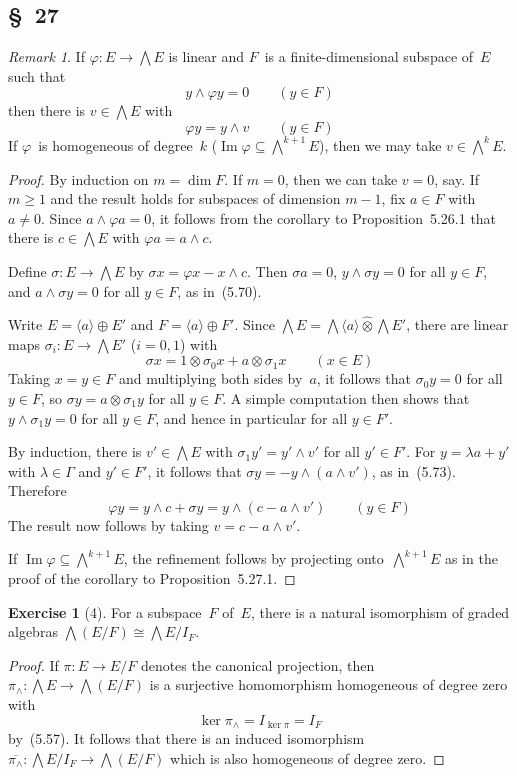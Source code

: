 \documentclass[letterpaper,12pt]{article}
\newcommand{\iso}{\cong}
\DeclareMathOperator{\im}{Im}
\newcommand{\dsum}{\oplus}
\newcommand{\tprod}{\otimes}
\newcommand{\stprod}{\mathbin{\widehat{\otimes}}}
\newcommand{\eprod}{\wedge}
\newcommand{\bigeprod}{\bigwedge}
\newcommand{\medeprod}{{\textstyle\bigeprod}}
\newcommand{\gen}[1]{\langle#1\rangle}
\newcommand{\proj}[1]{\overline{#1}}
\theoremstyle{definition}
\newtheorem*{exer}{Exercise}
\theoremstyle{remark}
\newtheorem*{rmk}{Remark}
\begin{document}
\subsection*{\S~27}
\begin{rmk}
If \(\varphi:E\to\medeprod E\) is linear and \(F\)~is a finite-dimensional subspace of~\(E\) such that
\[y\eprod\varphi y=0\qquad(y\in F)\]
then there is \(v\in\medeprod E\) with
\[\varphi y=y\eprod v\qquad(y\in F)\]
If \(\varphi\)~is homogeneous of degree~\(k\) (\(\im\varphi\subseteq\medeprod^{k+1}E\)), then we may take \(v\in\medeprod^k E\).
\end{rmk}
\begin{proof}
By induction on \(m=\dim F\). If \(m=0\), then we can take \(v=0\), say. If \(m\ge 1\) and the result holds for subspaces of dimension \(m-1\), fix \(a\in F\) with \(a\ne 0\). Since \(a\eprod\varphi a=0\), it follows from the corollary to Proposition~5.26.1 that there is \(c\in\medeprod E\) with \(\varphi a=a\eprod c\).

Define \(\sigma:E\to\medeprod E\) by \(\sigma x=\varphi x-x\eprod c\). Then \(\sigma a=0\), \(y\eprod\sigma y=0\) for all \(y\in F\), and \(a\eprod\sigma y=0\) for all \(y\in F\), as in~(5.70).

Write \(E=\gen{a}\dsum E'\) and \(F=\gen{a}\dsum F'\). Since \(\medeprod E=\medeprod\gen{a}\stprod\medeprod E'\), there are linear maps \(\sigma_i:E\to\medeprod E'\) (\(i=0,1\)) with
\[\sigma x=1\tprod\sigma_0 x+a\tprod\sigma_1 x\qquad(x\in E)\]
Taking \(x=y\in F\) and multiplying both sides by~\(a\), it follows that \(\sigma_0 y=0\) for all \(y\in F\), so \(\sigma y=a\tprod\sigma_1 y\) for all \(y\in F\). A simple computation then shows that \(y\eprod\sigma_1 y=0\) for all \(y\in F\), and hence in particular for all \(y\in F'\).

By induction, there is \(v'\in\medeprod E\) with \(\sigma_1 y'=y'\eprod v'\) for all \(y'\in F'\). For \(y=\lambda a+y'\) with \(\lambda\in\Gamma\) and \(y'\in F'\), it follows that \(\sigma y=-y\eprod(a\eprod v')\), as in~(5.73). Therefore
\[\varphi y=y\eprod c+\sigma y=y\eprod(c-a\eprod v')\qquad(y\in F)\]
The result now follows by taking \(v=c-a\eprod v'\).

If \(\im\varphi\subseteq\medeprod^{k+1} E\), the refinement follows by projecting onto~\(\medeprod^{k+1}E\) as in the proof of the corollary to Proposition~5.27.1.
\end{proof}

\begin{exer}[4]
For a subspace~\(F\) of~\(E\), there is a natural isomorphism of graded algebras \(\medeprod(E/F)\iso\medeprod E/I_F\).
\end{exer}
\begin{proof}
If \(\pi:E\to E/F\) denotes the canonical projection, then \(\pi_{\eprod}:\medeprod E\to\medeprod(E/F)\) is a surjective homomorphism homogeneous of degree zero with
\[\ker\pi_{\eprod}=I_{\ker\pi}=I_F\]
by~(5.57). It follows that there is an induced isomorphism \(\proj{\pi_{\eprod}}:\medeprod E/I_F\to\medeprod(E/F)\) which is also homogeneous of degree zero.
\end{proof}
\end{document}
